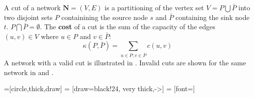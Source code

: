 \begin{definition}[Cut]
	A cut of a network $\textbf{N} = (V,E)$ is a partitioning of the vertex set $V = P \bigcup \bar{P}$ into two disjoint sets $P$ containining the source node $s$ and $\bar{P}$ containing the sink node $t$. $P \bigcap \bar{P} = \emptyset$.
	The \textbf{cost} of a cut is the sum of the capacity of the edges $(u,v) \in V$ where $u \in P$ and $v \in \bar{P}$:
	\begin{equation}
	\kappa (P, \bar{P}) = \sum_{u \in P; v \in \bar{P}} c(u,v)
	\end{equation}
	A network with a valid cut is illustrated in . Invalid cuts are shown for the same network in  and .
\end{definition}

=[circle,thick,draw]
 = [draw=black!24, very thick,->]
 = [font=\small]
